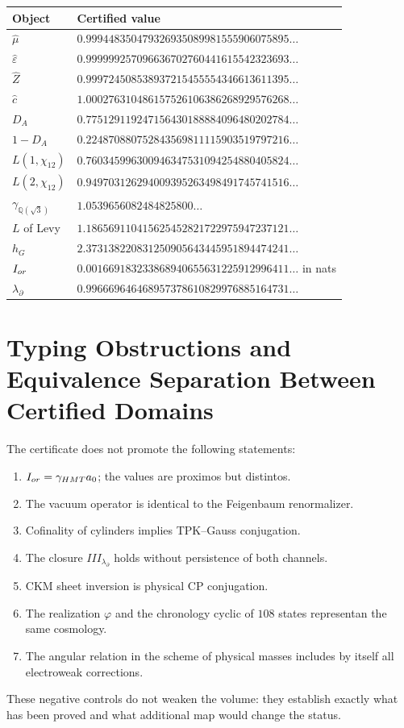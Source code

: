 \begin{longtable}{@{}>{\raggedright\arraybackslash}p{}>{\raggedright\arraybackslash}p{}@{}}
\toprule
Object & Certified value\\
\midrule
\endhead
\(\widehat\mu\) & \(0.999448350479326935089981555906075895\ldots\)\\
\(\widehat\varepsilon\) & \(0.999999257096636702760441615542323693\ldots\)\\
\(\widehat Z\) & \(0.999724508538937215455554346613611395\ldots\)\\
\(\widehat c\) & \(1.000276310486157526106386268929576268\ldots\)\\
\(D_A\) & \(0.775129119247156430188884096480202784\ldots\)\\
\(1-D_A\) & \(0.224870880752843569811115903519797216\ldots\)\\
\(L(1,\chi_{12})\) & \(0.760345996300946347531094254880405824\ldots\)\\
\(L(2,\chi_{12})\) & \(0.949703126294009395263498491745741516\ldots\)\\
\(\gamma_{\mathbb Q(\sqrt3)}\) & \(1.0539656082484825800\ldots\)\\
\(L\) of Levy & \(1.186569110415625452821722975947237121\ldots\)\\
\(h_G\) & \(2.373138220831250905643445951894474241\ldots\)\\
\(I_{\rm or}\) & \(0.001669183233868940655631225912996411\ldots\) in nats\\
\(\lambda_\partial\) & \(0.996669646468957378610829976885164731\ldots\)\\
\bottomrule
\end{longtable}

\section{Typing Obstructions and Equivalence Separation Between Certified Domains}

The certificate does not promote the following statements:

\begin{enumerate}
\item \(I_{\rm or}=\gammaH a_0\); the values are proximos but distintos.
\item The vacuum operator is identical to the Feigenbaum renormalizer.
\item Cofinality of cylinders implies TPK--Gauss conjugation.
\item The closure \(III_{\lambda_\partial}\) holds without persistence of both channels.
\item CKM sheet inversion is physical CP conjugation.
\item The realization \(\varphi\) and the chronology cyclic of \(108\) states
representan the same cosmology.
\item The angular relation in the scheme of physical masses includes by itself all electroweak corrections.
\end{enumerate}

These negative controls do not weaken the volume: they establish exactly what has been proved and what additional map would change the status.
